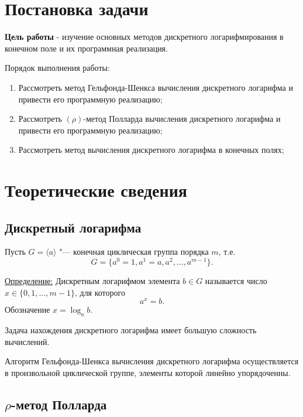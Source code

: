 \documentclass[bachelor, och, labwork]{shiza}
\begin{document}

\section{Постановка задачи}

    \textbf{Цель работы} - изучение основных методов дискретного
    логарифмирования в конечном поле и их программная реализация. 

    Порядок выполнения работы:
    \begin{enumerate}
        \item Рассмотреть метод Гельфонда-Шенкса вычисления дискретного
        логарифма и привести его программную реализацию;
        \item Рассмотреть $(\rho)$-метод Полларда вычисления дискретного
        логарифма и привести его программную реализацию;
        \item Рассмотреть метод вычисления дискретного логарифма в конечных
        полях;
    \end{enumerate}

\section{Теоретические сведения}

    \subsection{Дискретный логарифма}

        Пусть $G = \langle a \rangle$ "--- конечная циклическая группа порядка
        $m$, т.е. $$G = \{a^0 = 1, a^1 = a, a^2, \dots, a^{m - 1} \}.$$

        \underline{Определение:} Дискретным логарифмом элемента $b \in G$
        называется число $x \in \{0, 1, \dots, m - 1\}$, для которого $$a^x =
        b.$$ Обозначение $x = \log_a b$.

        Задача нахождения дискретного логарифма имеет большую сложность
        вычислений.

        Алгоритм Гельфонда-Шенкса вычисления дискретного логарифма
        осуществляется в произвольной циклической группе, элементы которой
        линейно упорядоченны.

    \subsection{$\rho$-метод Полларда}
\end{document}

